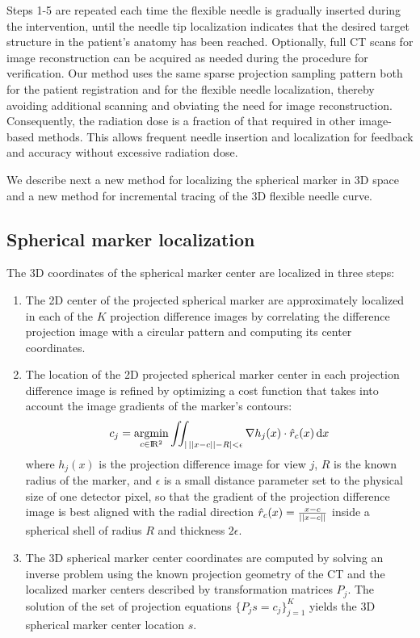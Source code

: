 Steps 1-5 are repeated each time the flexible needle is gradually inserted during the intervention, until the needle tip localization indicates that the desired target structure in the patient's anatomy has been reached. Optionally, full CT scans for image reconstruction can be acquired as needed during the procedure for verification. Our method uses the same sparse projection sampling pattern both for the patient registration and for the flexible needle localization, thereby avoiding additional scanning and obviating the need for image reconstruction. Consequently, the radiation dose is a fraction of that required in other image-based methods. This allows frequent needle insertion and localization for feedback and accuracy without excessive radiation dose.

We describe next a new method for localizing the spherical marker in 3D space and a new method for incremental tracing of the 3D flexible needle curve.

\subsection*{\textbf{Spherical marker localization}} \label{markerloc}
The 3D coordinates of the spherical marker center are localized in three steps:
\begin{enumerate}
    \item 
    {
    The 2D center of the projected spherical marker are approximately localized in each of the $K$ projection difference images by correlating the difference projection image with a circular pattern and computing its center coordinates. \\[0.01ex]
    }
    \item 
    {
    The location of the 2D projected spherical marker center in each projection difference image is refined by optimizing a cost function that takes into account the image gradients of the marker's contours:
    \begin{equation}
        c_j = \operatorname*{argmin}_{c \in \rm I\!R^2}{
        \iint_{\lvert \, \lvert\lvert x-c \rvert\rvert - R \rvert < \epsilon}
        {\nabla h_j(x) \cdot \hat{r}_c (x)} \, \mathrm{d}x}
    \end{equation}
    where $h_j(x)$ is the projection difference image for view $j$, $R$ is the known radius of the marker, and $\epsilon$ is a small distance parameter set to the physical size of one detector pixel, so that the gradient of the projection difference image is best aligned with the radial direction $\hat{r}_c (x) = \frac{x-c}{ \\\lvert\lvert x-c \rvert\rvert}$ inside a spherical shell of radius $R$ and thickness $2\epsilon$. \\[0.01ex]
    }
    \item {
    The 3D spherical marker center coordinates are computed by solving an inverse problem using the known projection geometry of the CT and the localized marker centers described by transformation matrices $P_j$. The solution of the set of projection equations $\{P_j s = c_j\}_{j=1}^K$  yields the 3D spherical marker center location $s$.}
\end{enumerate}
